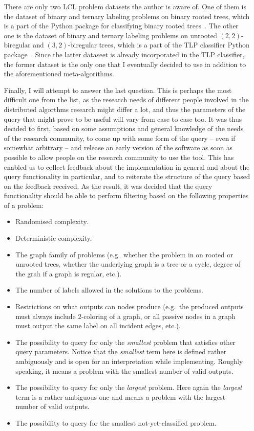 There are only two LCL problem datasets the author is aware of. One of them is the dataset of binary and ternary labeling problems on binary rooted trees, which is a
part of the Python package for classifying binary rooted trees~\cite{Tereshchenko2020brt}. The other one is the dataset of binary and ternary labeling problems on
unrooted $(2, 2)$-biregular and $(3, 2)$-biregular trees, which is a part of the TLP classifier Python package~\cite{Rocher2020clas}. Since the latter dataseet is already incorporated in the TLP classifier,
the former dataset is the only one that I eventually decided to use
in addition to the aforementioned meta-algorithms.

Finally, I will attempt to answer the last question.
This is perhaps the most difficult one from the list,
as the research needs of different people involved in
the distributed algorthms research might differ a lot, and thus
the parameters of the query that might prove to be useful
will vary from case to case too. It was thus decided to first,
based on some assumptions and general knowledge of the
needs of the research community, to come up with some form of the
query -- even if somewhat arbitrary -- and release an early version
of the software as soon as possible to allow people on the
research community to use the tool. This has enabled us to
collect feedback about the implementation in general and about the
query functionality in particular, and to reiterate the structure of
the query based on the feedback received. As the result, it was
decided that the query functionality should be able to perform
filtering based on the following properties of a problem:

\begin{itemize}
  \item Randomised complexity.
  \item Deterministic complexity.
  \item The graph family of problems (e.g.\ whether the problem in on
  rooted or unrooted trees, whether the underlying graph is a tree
  or a cycle, degree of the grah if a graph is regular, etc.).
  \item The number of labels allowed in the solutions to the problems.
  \item Restrictions on what outputs can nodes produce (e.g.\ the
  produced outputs must always include 2-coloring of a graph,
  or all passive nodes in a graph must output the same
  label on all incident edges, etc.).
  \item The possibility to query for only the \emph{smallest} problem that
  satisfies other query parameters. Notice that the \emph{smallest} term here is
  defined rather ambiguously and is open for an interpretation while implementing. Roughly speaking, it means a problem with the smallest
  number of valid outputs.
  \item The possibility to query for only the \emph{largest} problem. Here again
  the \emph{largest} term is a rather ambiguous one and means a problem with the largest
  number of valid outputs.
  \item The possibility to query for the smallest not-yet-classified problem.
\end{itemize}
